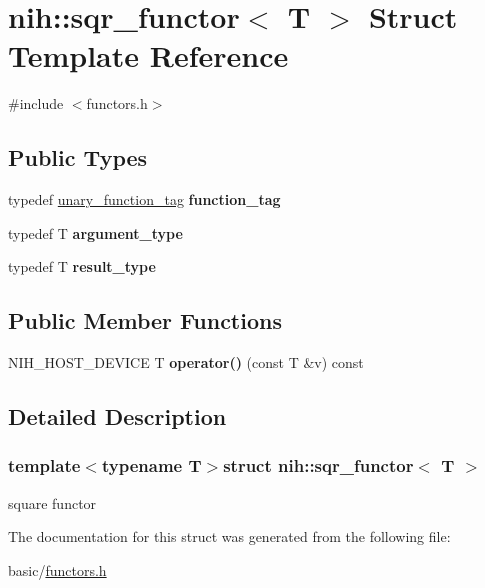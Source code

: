 \hypertarget{structnih_1_1sqr__functor}{
\section{nih\-:\-:sqr\-\_\-functor$<$ \-T $>$ \-Struct \-Template \-Reference}
\label{structnih_1_1sqr__functor}
}


{\ttfamily \#include $<$functors.\-h$>$}

\subsection*{\-Public \-Types}
\begin{DoxyCompactItemize}
\item 
\hypertarget{structnih_1_1sqr__functor_a7cf7565b700be17699328bdb8df14d66}{
typedef \hyperlink{structnih_1_1unary__function__tag}{unary\-\_\-function\-\_\-tag} {\bfseries function\-\_\-tag}}
\label{structnih_1_1sqr__functor_a7cf7565b700be17699328bdb8df14d66}

\item 
\hypertarget{structnih_1_1sqr__functor_a1752e79d1f70eae49085565e61983fb0}{
typedef \-T {\bfseries argument\-\_\-type}}
\label{structnih_1_1sqr__functor_a1752e79d1f70eae49085565e61983fb0}

\item 
\hypertarget{structnih_1_1sqr__functor_a666cf4f3f9b6f93d0e85b33697b3cf54}{
typedef \-T {\bfseries result\-\_\-type}}
\label{structnih_1_1sqr__functor_a666cf4f3f9b6f93d0e85b33697b3cf54}

\end{DoxyCompactItemize}
\subsection*{\-Public \-Member \-Functions}
\begin{DoxyCompactItemize}
\item 
\hypertarget{structnih_1_1sqr__functor_a4706146e5e3d2797131e275935138f6b}{
\-N\-I\-H\-\_\-\-H\-O\-S\-T\-\_\-\-D\-E\-V\-I\-C\-E \-T {\bfseries operator()} (const \-T \&v) const }
\label{structnih_1_1sqr__functor_a4706146e5e3d2797131e275935138f6b}

\end{DoxyCompactItemize}


\subsection{\-Detailed \-Description}
\subsubsection*{template$<$typename T$>$struct nih\-::sqr\-\_\-functor$<$ T $>$}

square functor 

\-The documentation for this struct was generated from the following file\-:\begin{DoxyCompactItemize}
\item 
basic/\hyperlink{functors_8h}{functors.\-h}\end{DoxyCompactItemize}
